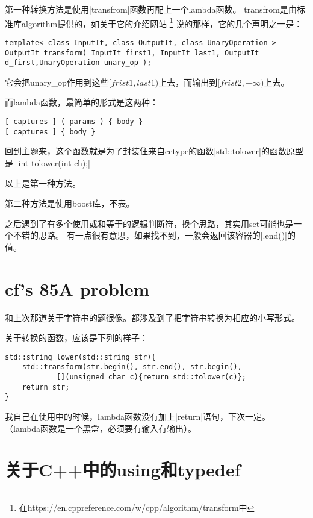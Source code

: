  第一种转换方法是使用\vb|transfrom|函数再配上一个lambda函数。
 transfrom是由标准库algorithm提供的，如关于它的介绍网站%
 \footnote{在https://en.cppreference.com/w/cpp/algorithm/transform中}%
 说的那样，它的几个声明之一是：

 \begin{lstlisting}
template< class InputIt, class OutputIt, class UnaryOperation >
OutputIt transform( InputIt first1, InputIt last1, OutputIt d_first,UnaryOperation unary_op );
\end{lstlisting}

它会把unary\_op作用到这些$[frist1, last1)$上去，而输出到$[frist2, +\infty)$上去。

而lambda函数，最简单的形式是这两种：

\begin{lstlisting}
[ captures ] ( params ) { body }
[ captures ] { body }
\end{lstlisting}

回到主题来，这个函数就是为了封装住来自cctype的函数\vb|std::tolower|的函数原型是
\vb|int tolower(int ch);|

以上是第一种方法。

第二种方法是使用boost库，不表。

之后遇到了有多个使用或和等于的逻辑判断符，换个思路，其实用set可能也是一个不错的思路。
有一点很有意思，如果找不到，一般会返回该容器的\vb|.end()|的值。



\section{cf's 85A problem}

和上次那道关于字符串的题很像。都涉及到了把字符串转换为相应的小写形式。

关于转换的函数，应该是下列的样子：

\begin{lstlisting}
std::string lower(std::string str){
    std::transform(str.begin(), str.end(), str.begin(),
            [](unsigned char c){return std::tolower(c)};
    return str;
}
\end{lstlisting}

我自己在使用中的时候，lambda函数没有加上\vb|return|语句，下次一定。
（lambda函数是一个黑盒，必须要有输入有输出）。


\section{关于C++中的using和typedef}

